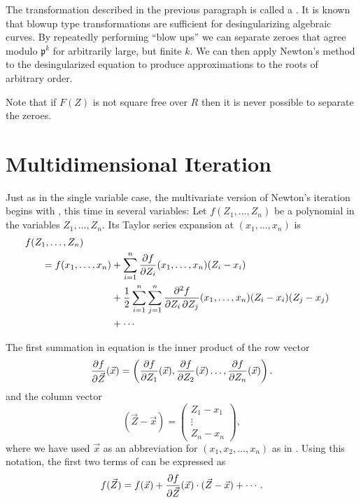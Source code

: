 {The transformation described in the previous paragraph is called a
.  It is known that blowup type transformations are
sufficient for desingularizing algebraic 
curves.  By repeatedly 
performing ``blow ups'' we can separate zeroes that agree modulo
$\mathfrak{p}^k$ for arbitrarily large, but finite $k$.  We can then
apply Newton's method to the desingularized equation to produce
approximations to the roots of arbitrary order.  

Note that if $F(Z)$ is not square free over $R$ then it is never
possible to separate the zeroes.

\section{Multidimensional Iteration}
\label{Multivariate:Newton:Sec}

Just as in the single variable case, the multivariate version of
Newton's iteration begins with , this time in several
variables: Let $f(Z_1, \ldots, Z_n)$ be a polynomial in the variables
$Z_1, \ldots, Z_n$.  Its Taylor series expansion at $(x_1,\ldots,
x_n)$ is
\begin{equation}\label{Hensel:8}
\begin{aligned}
  \multispan{1}{$f(Z_1,\ldots, Z_n)$}\\
    \qquad = f(x_1,\ldots, x_n) &\null + 
    \sum_{i=1}^n {\partial f \over \partial Z_i}(x_1,\ldots,x_n) 
    (Z_i - x_i)\\
   & + {1 \over 2} \sum_{i=1}^n \sum_{j=1}^n
    {\partial^2 f \over \partial Z_i \, \partial Z_j}(x_1,\ldots,x_n) 
    (Z_i - x_i) (Z_j - x_j)\\
   & + \cdots\\
\end{aligned}
\end{equation}

The first summation in equation  is the inner product
of the row vector
\[
{\partial f \over \partial \vec{Z}} (\vec{x}) =
\left({\partial f \over \partial Z_1} (\vec{x}), 
{\partial f \over \partial Z_2} (\vec{x})
\ldots, {\partial f \over \partial Z_n} (\vec{x}) \right).
\]
and the column vector
\[
(\vec{Z} - \vec{x}) = \begin{pmatrix}Z_1 - x_1\\ \vdots\\ Z_n - x_n\end{pmatrix},
\]
where we have used $\vec{x}$ as an abbreviation for $(x_1, x_2, \ldots,
x_n)$ as in .  Using this notation, the
first two terms of  can be expressed as
\[
f(\vec{Z} ) = f(\vec{x}) + {\partial f \over \partial \vec{Z}}
(\vec{x}) \cdot (\vec{Z}  - \vec{x}) + \cdots.
\]

}
